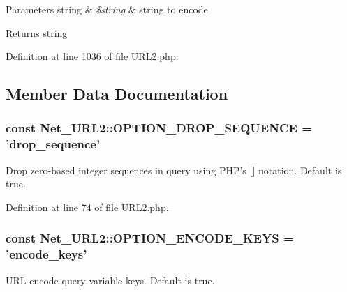 \begin{DoxyParams}[1]{Parameters}
string & {\em \$string} & string to encode\\
\hline
\end{DoxyParams}
\begin{DoxyReturn}{Returns}
string 
\end{DoxyReturn}


Definition at line 1036 of file U\-R\-L2.\-php.



\subsection{Member Data Documentation}
\hypertarget{classNet__URL2_af415684f1d85246c1132203142b86499}{
\subsubsection[{O\-P\-T\-I\-O\-N\-\_\-\-D\-R\-O\-P\-\_\-\-S\-E\-Q\-U\-E\-N\-C\-E}]{\setlength{\rightskip}{0pt plus 5cm}const Net\-\_\-\-U\-R\-L2\-::\-O\-P\-T\-I\-O\-N\-\_\-\-D\-R\-O\-P\-\_\-\-S\-E\-Q\-U\-E\-N\-C\-E = 'drop\-\_\-sequence'}}\label{classNet__URL2_af415684f1d85246c1132203142b86499}
Drop zero-\/based integer sequences in query using P\-H\-P's \mbox{[}\mbox{]} notation. Default is true. 

Definition at line 74 of file U\-R\-L2.\-php.

\hypertarget{classNet__URL2_ae06ebc991de4ffe92644c5a8d37ad5ac}{
\subsubsection[{O\-P\-T\-I\-O\-N\-\_\-\-E\-N\-C\-O\-D\-E\-\_\-\-K\-E\-Y\-S}]{\setlength{\rightskip}{0pt plus 5cm}const Net\-\_\-\-U\-R\-L2\-::\-O\-P\-T\-I\-O\-N\-\_\-\-E\-N\-C\-O\-D\-E\-\_\-\-K\-E\-Y\-S = 'encode\-\_\-keys'}}\label{classNet__URL2_ae06ebc991de4ffe92644c5a8d37ad5ac}
U\-R\-L-\/encode query variable keys. Default is true. 

